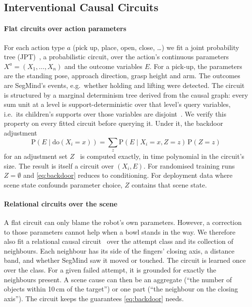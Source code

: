 \documentclass[letterpaper, 10 pt, conference]{ieeeconf}
\newcommand{\segmind}{SegMind}
\newcommand{\pr}{\mathrm{P}}
\newcommand{\dop}{\mathrm{do}}
\begin{document}
\subsection{Interventional Causal Circuits}
\label{sec:circuits}

\paragraph*{Flat circuits over action parameters}
For each action type $a$ (pick up, place, open, close, \dots) we fit a joint
probability tree (JPT)~\cite{nyga2023jpt}, a probabilistic circuit, over the action's
continuous parameters $X^a = (X_1, \dots, X_n)$ and the outcome variables $E$. For a pick-up, the parameters are the
standing pose, approach direction, grasp height and arm. The outcomes are
\segmind{}'s events, e.g.\ whether holding and lifting were detected. The
circuit is structured by a marginal determinism tree derived from the causal
graph: every sum unit at a level is support-deterministic over that level's
query variables, i.e.\ its children's supports over those variables are
disjoint~\cite{wang2023compositional}. We verify this property on every fitted
circuit before querying it. Under it, the backdoor adjustment
\begin{equation}
  \pr(E \mid \dop(X_i = x)) = \sum_{z} \pr(E \mid X_i = x, Z = z)\,\pr(Z = z)
  \label{eq:backdoor}
\end{equation}
for an adjustment set $Z$~\cite{pearl2009causality} is computed exactly, in time polynomial in the
circuit's size. The result is itself a circuit over $(X_i, E)$. For randomised
training runs $Z = \emptyset$ and \eqref{eq:backdoor} reduces to conditioning.
For deployment data where scene state confounds parameter choice, $Z$ contains
that scene state.

\paragraph*{Relational circuits over the scene}
A flat circuit can only blame the robot's own parameters. However, a correction
to those parameters cannot help when a bowl stands in the way. We therefore
also fit a relational causal circuit~\cite{anon2027relational} over the attempt
class and its collection of neighbours. Each neighbour has its side of the
fingers' closing axis, a distance band, and whether \segmind{} saw it moved or
touched. The circuit is learned once over the class. For a given failed
attempt, it is grounded for exactly the neighbours present. A scene cause can
then be an aggregate (``the number of objects within 10\,cm of the target'') or
one part (``the neighbour on the closing axis''). The circuit keeps the guarantees
\eqref{eq:backdoor} needs.
\end{document}
